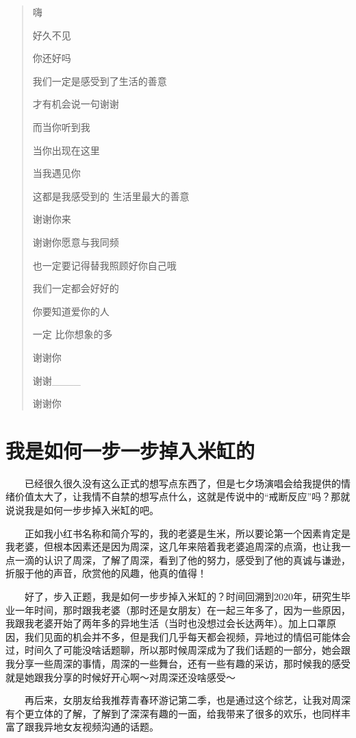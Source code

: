 \documentclass[
]{book}
\begin{document}
\begin{quote}
嗨

好久不见

你还好吗

我们一定是感受到了生活的善意

才有机会说一句谢谢

而当你听到我

当你出现在这里

当我遇见你

这都是我感受到的 生活里最大的善意

谢谢你来

谢谢你愿意与我同频

也一定要记得替我照顾好你自己哦

我们一定都会好好的

你要知道爱你的人

一定 比你想象的多

谢谢你

谢谢\_\_\_\_

谢谢你
\end{quote}

\chapter{我是如何一步一步掉入米缸的}\label{appendix-my-journey}

\emph{\citet{my-journey}}

  已经很久很久没有这么正式的想写点东西了，但是七夕场演唱会给我提供的情绪价值太大了，让我情不自禁的想写点什么，这就是传说中的``戒断反应''吗？那就说说我是如何一步步掉入米缸的吧。

  正如我小红书名称和简介写的，我的老婆是生米，所以要论第一个因素肯定是我老婆，但根本因素还是因为周深，这几年来陪着我老婆追周深的点滴，也让我一点一滴的认识了周深，了解了周深，看到了他的努力，感受到了他的真诚与谦逊，折服于他的声音，欣赏他的风趣，他真的值得！

  好了，步入正题，我是如何一步步掉入米缸的？时间回溯到2020年，研究生毕业一年时间，那时跟我老婆（那时还是女朋友）在一起三年多了，因为一些原因，我跟我老婆开始了两年多的异地生活（当时也没想过会长达两年）。加上口罩原因，我们见面的机会并不多，但是我们几乎每天都会视频，异地过的情侣可能体会过，时间久了可能没啥话题聊，所以那时候周深成为了我们话题的一部分，她会跟我分享一些周深的事情，周深的一些舞台，还有一些有趣的采访，那时候我的感受就是她跟我分享的时候好开心啊～对周深还没啥感受～

  再后来，女朋友给我推荐青春环游记第二季，也是通过这个综艺，让我对周深有个更立体的了解，了解到了深深有趣的一面，给我带来了很多的欢乐，也同样丰富了跟我异地女友视频沟通的话题。
\end{document}
